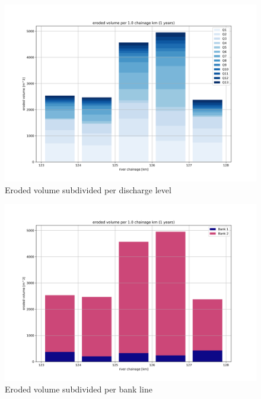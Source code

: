 \begin{figure}
\includegraphics[width=\textwidth]{figures/3_eroded_volume_per_discharge.png}
\caption{Eroded volume subdivided per discharge level}
\label{Fig2.6a}
\end{figure}

\begin{figure}
\includegraphics[width=\textwidth]{figures/4_eroded_volume_per_bank.png}
\caption{Eroded volume subdivided per bank line}
\label{Fig2.6b}
\end{figure}

